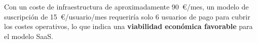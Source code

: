 Con un coste de infraestructura de aproximadamente 90~€/mes, un modelo de
suscripción de 15~€/usuario/mes requeriría solo 6 usuarios de pago para
cubrir los costes operativos, lo que indica una \textbf{viabilidad económica
favorable} para el modelo SaaS.


